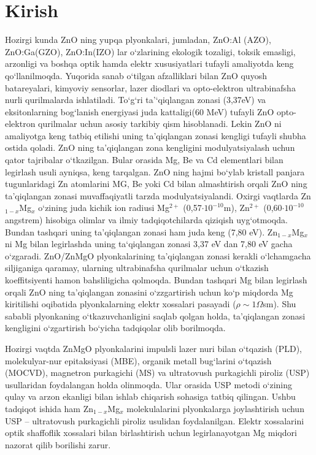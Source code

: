 \documentclass[14pt]{article}
\begin{document}
	\section{Kirish}
	\hspace{1cm}	
	Hozirgi kunda ZnO ning yupqa plyonkalari, jumladan, ZnO:Al (AZO), ZnO:Ga(GZO), ZnO:In(IZO) lar o`zlarining ekologik tozaligi, toksik emasligi, arzonligi va boshqa optik hamda elektr xususiyatlari tufayli amaliyotda keng qo`llanilmoqda. Yuqorida sanab o`tilgan afzalliklari bilan ZnO quyosh batareyalari, kimyoviy sensorlar, lazer diodlari va opto-elektron ultrabinafsha nurli qurilmalarda ishlatiladi. To`g`ri ta'`qiqlangan zonasi  (3,37eV) va eksitonlarning bog`lanish energiyasi juda kattaligi(60 MeV) tufayli ZnO opto-elektron qurilmalar uchun asosiy tarkibiy qism hisoblanadi. Lekin ZnO ni amaliyotga keng tatbiq etilishi uning ta'qiqlangan zonasi kengligi tufayli shubha ostida qoladi. ZnO ning ta'qiqlangan zona kengligini modulyatsiyalash uchun qator tajribalar o`tkazilgan. Bular orasida Mg, Be va Cd elementlari bilan legirlash usuli ayniqsa, keng tarqalgan. ZnO ning hajmi bo`ylab kristall panjara tugunlaridagi Zn atomlarini MG, Be yoki Cd bilan almashtirish  orqali ZnO ning ta'qiqlangan zonasi muvaffaqiyatli tarzda modulyatsiyalandi. 
	Oxirgi vaqtlarda  Zn$_{1-x}$Mg$_{x}$ o`zining juda kichik ion radiusi Mg$^{2+}$ (0,57$\cdot 10^{-10}$m), Zn$^{2+}$ (0,60$\cdot 10^{-10}$ angstrem) hisobiga olimlar va ilmiy tadqiqotchilarda qiziqish uyg`otmoqda. Bundan tashqari uning ta'qiqlangan zonasi ham juda keng (7,80 eV). Zn$_{1-x}$Mg$_{x}$ ni  Mg bilan legirlashda uning ta`qiqlangan zonasi 3,37 eV dan 7,80 eV gacha o`zgaradi. ZnO/ZnMgO plyonkalarining ta'qiqlangan zonasi kerakli o`lchamgacha siljiganiga qaramay, ularning ultrabinafsha qurilmalar uchun o`tkazish koeffitsiyenti hamon bahsliligicha qolmoqda. Bundan tashqari Mg bilan legirlash orqali ZnO ning ta'qiqlangan zonasini o`zzgartirish uchun ko`p miqdorda Mg kiritilishi oqibatida plyonkalarning elektr xossalari pasayadi ($\rho\sim 1 \Omega$sm). 
	Shu sababli plyonkaning o`tkazuvchanligini saqlab qolgan holda, ta'qiqlangan zonasi kengligini o`zgartirish bo`yicha tadqiqolar olib borilmoqda. 
	
	Hozirgi vaqtda ZnMgO plyonkalarini impulsli lazer nuri bilan o`tqazish (PLD), molekulyar-nur epitaksiyasi (MBE), organik metall bug`larini o`tqazish (MOCVD), magnetron purkagichi (MS) va ultratovush purkagichli piroliz (USP) usullaridan foydalangan holda olinmoqda. Ular orasida USP metodi o`zining qulay va arzon ekanligi bilan ishlab chiqarish sohasiga tatbiq qilingan. 
	Ushbu tadqiqot ishida ham Zn$_{1-x}$Mg$_{x}$ molekulalarini plyonkalarga joylashtirish uchun USP -- ultratovush purkagichli piroliz usulidan foydalanilgan. Elektr xossalarini optik shaffoflik xossalari bilan birlashtirish uchun legirlanayotgan Mg miqdori nazorat qilib borilishi zarur. 
	
\end{document}
